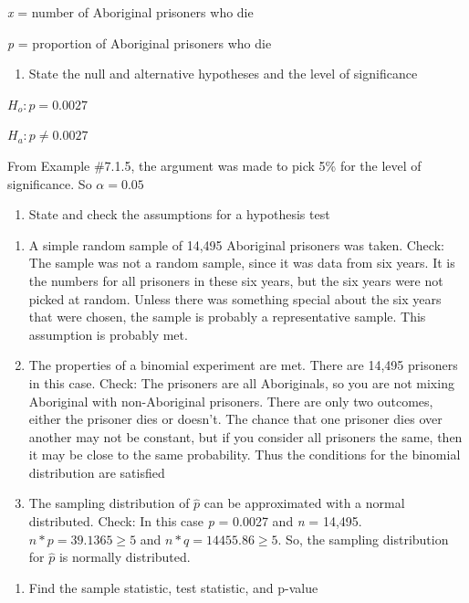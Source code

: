 \documentclass[]{book}
\providecommand{\tightlist}{%
  \setlength{\itemsep}{0pt}\setlength{\parskip}{0pt}}
\begin{document}
\emph{x} = number of Aboriginal prisoners who die

\emph{p} = proportion of Aboriginal prisoners who die

\begin{enumerate}
\def\labelenumi{\arabic{enumi}.}
\setcounter{enumi}{1}
\tightlist
\item
  State the null and alternative hypotheses and the level of significance
\end{enumerate}

\(H_o:p=0.0027\)

\(H_a:p\ne0.0027\)

From Example \#7.1.5, the argument was made to pick 5\% for the level of significance. So \(\alpha=0.05\)

\begin{enumerate}
\def\labelenumi{\arabic{enumi}.}
\setcounter{enumi}{2}
\tightlist
\item
  State and check the assumptions for a hypothesis test
\end{enumerate}

\begin{enumerate}
\def\labelenumi{\alph{enumi}.}
\item
  A simple random sample of 14,495 Aboriginal prisoners was taken. Check: The sample was not a random sample, since it was data from six years. It is the numbers for all prisoners in these six years, but the six years were not picked at random. Unless there was something special about the six years that were chosen, the sample is probably a representative sample. This assumption is probably met.
\item
  The properties of a binomial experiment are met. There are 14,495 prisoners in this case. Check: The prisoners are all Aboriginals, so you are not mixing Aboriginal with non-Aboriginal prisoners. There are only two outcomes, either the prisoner dies or doesn't. The chance that one prisoner dies over another may not be constant, but if you consider all prisoners the same, then it may be close to the same probability. Thus the conditions for the binomial distribution are satisfied
\item
  The sampling distribution of \(\hat{p}\) can be approximated with a normal distributed. Check: In this case \emph{p} = 0.0027 and \emph{n} = 14,495. \(n*p=39.1365\ge5\) and \(n*q=14455.86\ge5\). So, the sampling distribution for \(\hat{p}\) is normally distributed.
\end{enumerate}

\begin{enumerate}
\def\labelenumi{\arabic{enumi}.}
\setcounter{enumi}{3}
\tightlist
\item
  Find the sample statistic, test statistic, and p-value
\end{enumerate}
\end{document}
